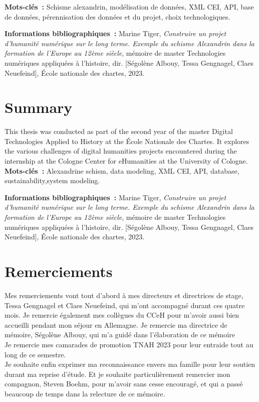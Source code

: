 \documentclass[a4paper,12pt,twoside]{book}
\begin{document}
	\textbf{Mots-clés~:} Schisme alexandrin, modélisation de données, XML CEI, API, base de données, pérennisation des données et du projet, choix technologiques.

	
	\textbf{Informations bibliographiques~:} Marine Tiger, \textit{Construire un projet d'humanité numérique sur le long terme. Exemple du schisme Alexandrin dans la formation de l’Europe au 12ème siècle}, mémoire de master \og{}Technologies numériques appliquées à l'histoire\fg{}, dir. [Ségolène Albouy, Tessa Gengnagel, Claes Neuefeind], École nationale des chartes, 2023.
    
    \chapter{Summary}
	\medskip
	This thesis was conducted as part of the second year of the master Digital Technologies Applied to History at the École Nationale des Chartes. It explores the various challenges of digital humanities projects encountered during the internship at the Cologne Center for eHumanities at the University of Cologne.\\
	
	\textbf{Mots-clés~:} Alexandrine schism, data modeling, XML CEI, API, database, sustainability,system modeling.

	
	\textbf{Informations bibliographiques~:} Marine Tiger, \textit{Construire un projet d'humanité numérique sur le long terme. Exemple du schisme Alexandrin dans la formation de l’Europe au 12ème siècle}, mémoire de master \og{}Technologies numériques appliquées à l'histoire\fg{}, dir. [Ségolène Albouy, Tessa Gengnagel, Claes Neuefeind], École nationale des chartes, 2023.
	
		\newpage{\pagestyle{empty}\cleardoublepage}
	
	\chapter{Remerciements}
	
	Mes remerciements vont tout d'abord à mes directeurs et directrices de stage, Tessa Gengnagel et Claes Neuefeind, qui m'ont accompagné durant ces quatre mois. Je remercie également mes collègues du CCeH pour m'avoir aussi bien accueilli pendant mon séjour en Allemagne. Je remercie ma directrice de mémoire, Ségolène Albouy, qui m'a guidé dans l'élaboration de ce mémoire\\
    Je remercie mes camarades de promotion TNAH 2023 pour leur entraide tout au long de ce semestre.\\
    Je souhaite enfin exprimer ma reconnaissance envers ma famille pour leur soutien durant ma reprise d'étude. Et je souhaite particulièrement remercier mon compagnon, Steven Boehm, pour m'avoir sans cesse encouragé, et qui a passé beaucoup de temps dans la relecture de ce mémoire.
   
\end{document}
